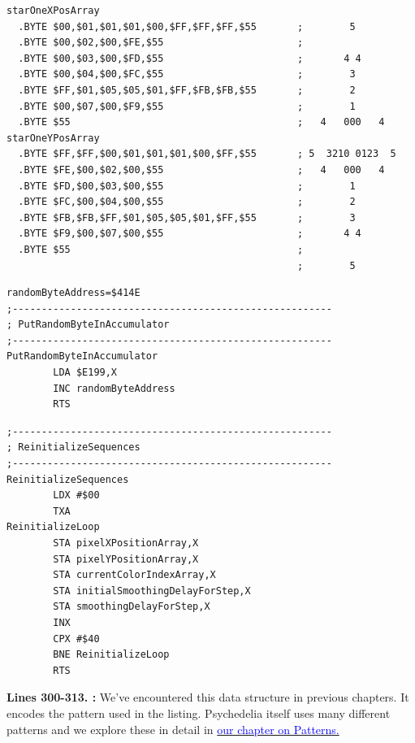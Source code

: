 {\clearpage
\begin{lstlisting}[caption = Hopefully this looks familiar.]
starOneXPosArray
  .BYTE $00,$01,$01,$01,$00,$FF,$FF,$FF,$55       ;        5       
  .BYTE $00,$02,$00,$FE,$55                       ;                
  .BYTE $00,$03,$00,$FD,$55                       ;       4 4      
  .BYTE $00,$04,$00,$FC,$55                       ;        3       
  .BYTE $FF,$01,$05,$05,$01,$FF,$FB,$FB,$55       ;        2       
  .BYTE $00,$07,$00,$F9,$55                       ;        1       
  .BYTE $55                                       ;   4   000   4  
starOneYPosArray
  .BYTE $FF,$FF,$00,$01,$01,$01,$00,$FF,$55       ; 5  3210 0123  5
  .BYTE $FE,$00,$02,$00,$55                       ;   4   000   4  
  .BYTE $FD,$00,$03,$00,$55                       ;        1       
  .BYTE $FC,$00,$04,$00,$55                       ;        2       
  .BYTE $FB,$FB,$FF,$01,$05,$05,$01,$FF,$55       ;        3       
  .BYTE $F9,$00,$07,$00,$55                       ;       4 4      
  .BYTE $55                                       ;                
                                                  ;        5       
\end{lstlisting}

\bigskip
\begin{lstlisting}[caption= Random\, unused\, feels like a metaphor.]
randomByteAddress=$414E
;-------------------------------------------------------
; PutRandomByteInAccumulator
;-------------------------------------------------------
PutRandomByteInAccumulator   
        LDA $E199,X
        INC randomByteAddress
        RTS 
\end{lstlisting}
\bigskip
\begin{lstlisting}[caption = Fill our pixel arrays with zeros.]
;-------------------------------------------------------
; ReinitializeSequences
;-------------------------------------------------------
ReinitializeSequences   
        LDX #$00
        TXA 
ReinitializeLoop   
        STA pixelXPositionArray,X
        STA pixelYPositionArray,X
        STA currentColorIndexArray,X
        STA initialSmoothingDelayForStep,X
        STA smoothingDelayForStep,X
        INX 
        CPX #$40
        BNE ReinitializeLoop
        RTS 

\end{lstlisting}
\clearpage

\textbf{Lines 300-313. :} We've encountered this data structure in previous chapters. It encodes the pattern used in the listing.
Psychedelia itself uses many different patterns and we explore these in detail in
\hyperref[sec:patterns]{\textcolor{blue}{our chapter on Patterns.}} 

}
